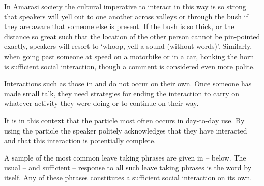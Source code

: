 In Amarasi society the cultural imperative to interact in this way
is so strong that speakers will yell out to one another across
valleys or through the bush if they are aware that someone else is present.
If the bush is so thick, or the distance so great such that the location
of the other person cannot be pin-pointed exactly,
speakers will resort to  `whoop, yell a sound (without words)'.
Similarly, when going past someone at speed on a motorbike or in a car,
honking the horn is sufficient social interaction,
though a comment is considered even more polite.

Interactions such as those in 
and  do not occur on their own.
Once someone has made small talk,
they need strategies for ending the interaction 
to carry on whatever activity they were doing
or to continue on their way.

It is in this context that the particle 
most often occurs in day-to-day use.
By using the particle  the speaker
politely acknowledges that they have interacted
and that this interaction is potentially complete.

A sample of the most common leave taking phrases
are given in -- below.
The usual -- and sufficient -- response to all such 
leave taking phrases is the word  by itself.
Any of these phrases constitutes a sufficient social interaction on its own.

\begin{multicols}{2}
	\begin{exe}
		\label{ex:au 'koon goen tua}
		\label{ex:au 'fain jeen tua}
	\end{exe}
\end{multicols}

